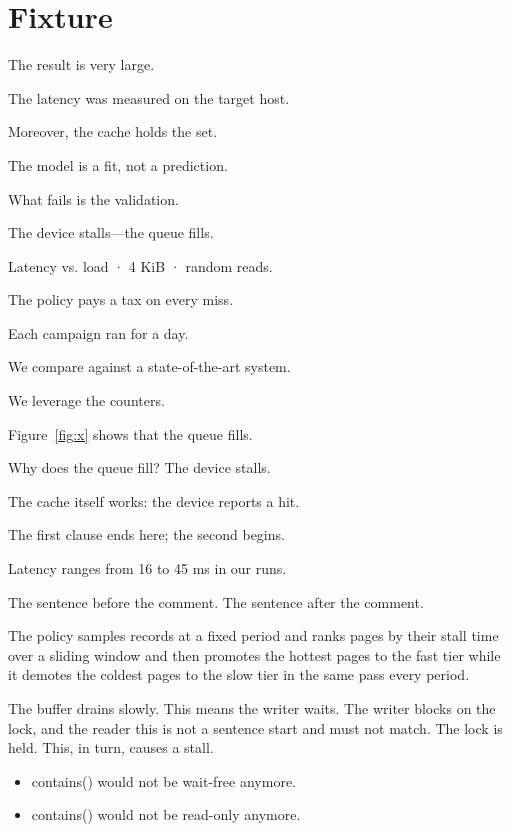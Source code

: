 \section{Fixture}

The result is very large.

The latency was measured on the target host.

Moreover, the cache holds the set.

The model is a fit, not a prediction.

What fails is the validation.

The device stalls---the queue fills.

Latency vs. load · 4 KiB · random reads.

The policy pays a tax on every miss.

Each campaign ran for a day.

We compare against a state-of-the-art system.

We leverage the counters.

Figure~\ref{fig:x} shows that the queue fills.

Why does the queue fill? The device stalls.

The cache itself works: the device reports a hit.

The first clause ends here; the second begins.

Latency ranges from 16 to 45 ms in our runs.

The sentence before the comment.
The sentence after the comment.

The policy samples records at a fixed period and ranks pages by their stall time over a sliding window and then promotes the hottest pages to the fast tier while it demotes the coldest pages to the slow tier in the same pass every period.

The buffer drains slowly. This means the writer waits.
The writer blocks on the lock, and the reader
this is not a sentence start and must not match.
The lock is held. This, in turn, causes a stall.

\begin{itemize}
\item contains() would not be wait-free anymore.
\item contains() would not be read-only anymore.
\end{itemize}
